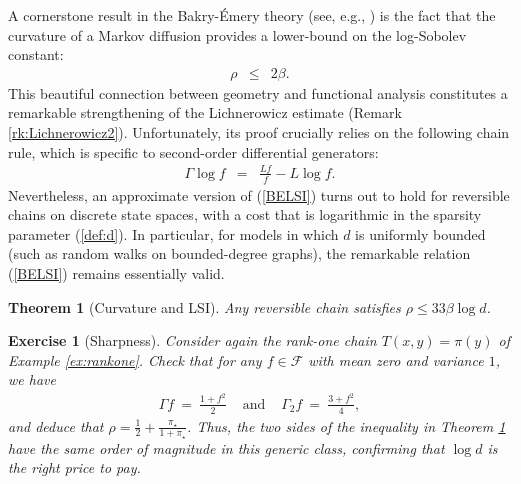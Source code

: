 \documentclass[12pt,final]{article}
\newtheorem{theorem}{Theorem}[section]
\newtheorem{exo}{Exercise}[section]
\numberwithin{equation}{section}
\newcommand{\cF}{\mathcal {F}}
\begin{document}
A cornerstone result in the Bakry-\'Emery theory (see, e.g.,  \cite{MR889476,MR1767995,MR3155209}) is the fact that the curvature of a Markov diffusion provides a lower-bound on the log-Sobolev constant:
\begin{eqnarray}
\label{BELSI}
\rho & \leq & 2\beta. 
\end{eqnarray}
This beautiful connection between geometry and functional analysis constitutes a remarkable strengthening of the Lichnerowicz estimate (Remark \ref{rk:Lichnerowicz2}). Unfortunately, its proof crucially relies on the following chain rule, which is specific to second-order differential generators:
\begin{eqnarray}
\label{chain}
\Gamma \log f & = & \frac{Lf}{f}-L\log f.
\end{eqnarray}
 Nevertheless, an approximate version of (\ref{BELSI}) turns out to hold for reversible chains on discrete state spaces, with a cost that is logarithmic in the sparsity parameter (\ref{def:d}). In particular, for models in which $d$ is uniformly bounded (such as  random walks on bounded-degree graphs), the remarkable relation (\ref{BELSI}) remains essentially valid.  
\begin{theorem}[Curvature and LSI]\label{th:BELSI}Any reversible chain satisfies $\rho  \leq 33 \beta\log d$. 
\end{theorem}
\begin{exo}[Sharpness]Consider again the rank-one chain $T(x,y)=\pi(y)$ of Example \ref{ex:rankone}. Check that for any $f\in\cF$ with mean zero and variance $1$, we have 
\begin{eqnarray*}
\Gamma f \ = \ \frac{1+f^2}{2} & \textrm{ and } & \Gamma_2f \ = \ \frac{3+f^2}{4},
\end{eqnarray*}
and deduce that $\rho=\frac{1}{2}+\frac{\pi_\star}{1+\pi_\star}$. Thus, the two sides of the inequality in Theorem \ref{th:BELSI} have the same order of magnitude in this generic class, confirming that $\log d$ is the right price to pay.
\end{exo}
\end{document}
